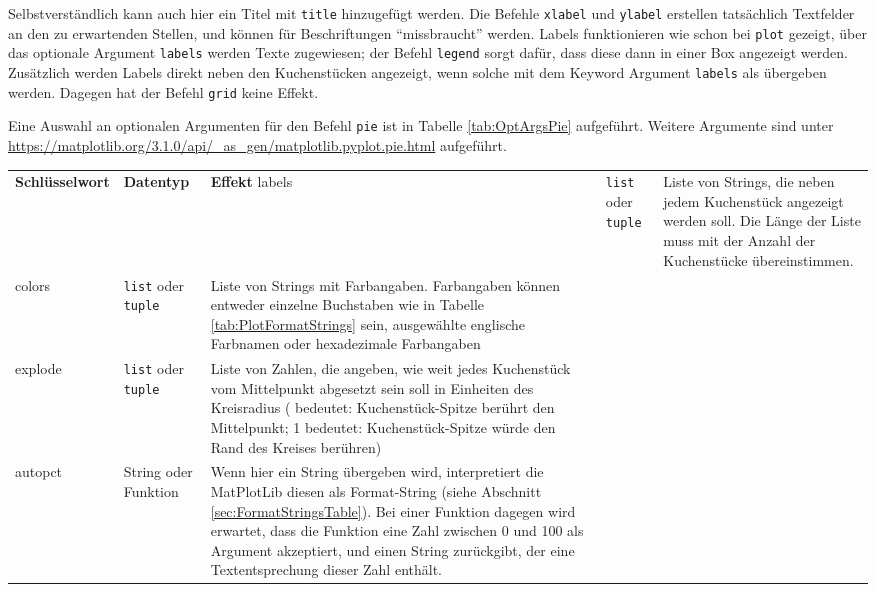 Selbstverständlich kann auch hier ein Titel mit \texttt{title} hinzugefügt werden. Die Befehle \texttt{xlabel} und \texttt{ylabel} erstellen tatsächlich Textfelder an den zu erwartenden Stellen, und können für Beschriftungen \enquote{missbraucht} werden. Labels funktionieren wie schon bei \texttt{plot} gezeigt, \ie über das optionale Argument \texttt{labels} werden Texte zugewiesen; der Befehl \texttt{legend} sorgt dafür, dass diese dann in einer Box angezeigt werden. Zusätzlich werden Labels direkt neben den Kuchenstücken angezeigt, wenn solche mit dem Keyword Argument \texttt{labels} als  übergeben werden. Dagegen hat der Befehl \texttt{grid} keine Effekt. 

Eine Auswahl an optionalen Argumenten für den Befehl \texttt{pie} ist in Tabelle \ref{tab:OptArgsPie} aufgeführt. Weitere Argumente sind unter \url{https://matplotlib.org/3.1.0/api/_as_gen/matplotlib.pyplot.pie.html} aufgeführt.

\begin{tcolorbox}[title=Auswahl an Optionalen Argumenten bei \texttt{pie}]
	\begin{tabularx}
		{\linewidth}
		{>{\ttfamily}p{.2\linewidth} | p{.2\linewidth} p{.5\linewidth}}
		\textrm{\textbf{Schlüsselwort}} & \textbf{Datentyp} & \textbf{Effekt} \tabcrlf
		labels & 
			\texttt{list} oder \texttt{tuple} &
			Liste von Strings, die neben jedem Kuchenstück angezeigt werden soll. Die Länge der Liste muss mit der Anzahl der Kuchenstücke
			 übereinstimmen.\\
		colors &
			\texttt{list} oder \texttt{tuple} &
			Liste von Strings mit Farbangaben. Farbangaben können entweder einzelne Buchstaben wie in Tabelle \ref{tab:PlotFormatStrings} sein, ausgewählte englische
			Farbnamen oder hexadezimale Farbangaben \\
		explode &
			\texttt{list} oder \texttt{tuple} &
			Liste von Zahlen, die angeben, wie weit jedes Kuchenstück vom Mittelpunkt abgesetzt sein soll in Einheiten des Kreisradius ( bedeutet: Kuchenstück-Spitze
			berührt den Mittelpunkt; 1 bedeutet: Kuchenstück-Spitze würde den Rand des Kreises berühren) \\
		autopct &
			String oder Funktion &
			Wenn hier ein String übergeben wird, interpretiert die MatPlotLib diesen als Format-String (siehe Abschnitt \ref{sec:FormatStringsTable}).
			Bei einer Funktion dagegen wird erwartet, dass die Funktion eine Zahl zwischen 0 und 100 als Argument akzeptiert, und einen String zurückgibt, der eine
			Textentsprechung dieser Zahl enthält.
	\end{tabularx}
	\label{tab:OptArgsPie}
\end{tcolorbox}

